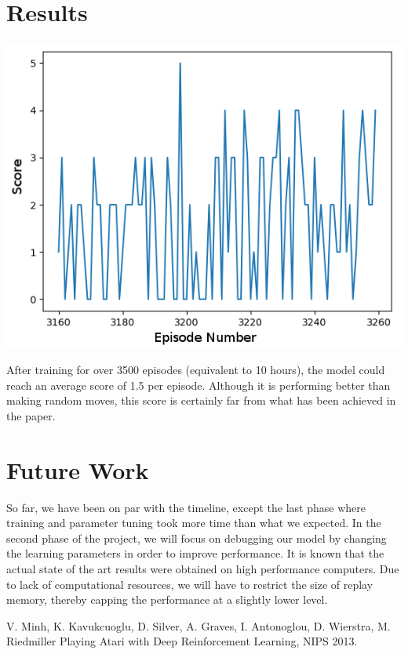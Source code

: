 \documentclass[conference]{IEEEtran}
\begin{document}
\section{Results}
\begin{center}
\includegraphics[scale=0.3]{Result.png}
\end{center}
After training for over 3500 episodes (equivalent to 10 hours), the model could reach an average score of 1.5 per episode. Although it is performing better than making random moves, this score is certainly far from what has been achieved in the paper. 
\section{Future Work}
So far, we have been on par with the timeline, except the last phase where training and parameter tuning took more time than what we expected. In the second phase of the project, we will focus on debugging our model by changing the learning parameters in order to improve performance. It is known that the actual state of the art results were obtained on high performance computers. Due to lack of computational resources, we will have to restrict the size of replay memory, thereby capping the performance at a slightly lower level.  

\begin{thebibliography}{00}
 V. Minh, K. Kavukcuoglu, D. Silver, A. Graves, I. Antonoglou, D. Wierstra, M. Riedmiller Playing Atari with Deep Reinforcement Learning, NIPS 2013.
\end{thebibliography}
\end{document}
